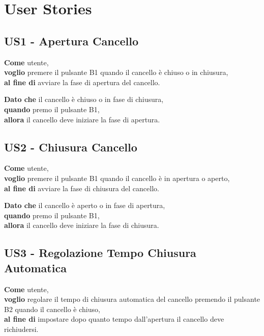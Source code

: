 \chapter{\bf{User Stories}}

\section{US1 - Apertura Cancello}
\begin{tcolorbox}[title={Descrizione}, colback=red!20!white, colframe=red!80!black]
    \textbf{Come} utente, \\
    \textbf{voglio} premere il pulsante B1 quando il cancello è chiuso o in chiusura, \\
    \textbf{al fine di} avviare la fase di apertura del cancello.
\end{tcolorbox}

\begin{tcolorbox}[title={Criterio di Accettazione}, colback=blue!20!white, colframe=blue!80!black]
    \textbf{Dato che} il cancello è chiuso o in fase di chiusura, \\
    \textbf{quando} premo il pulsante B1, \\
    \textbf{allora} il cancello deve iniziare la fase di apertura.
\end{tcolorbox}

\section{US2 - Chiusura Cancello}
\begin{tcolorbox}[title={Descrizione}, colback=red!20!white, colframe=red!80!black]
    \textbf{Come} utente, \\
    \textbf{voglio} premere il pulsante B1 quando il cancello è in apertura o aperto, \\
    \textbf{al fine di} avviare la fase di chiusura del cancello.
\end{tcolorbox}

\begin{tcolorbox}[title={Criterio di Accettazione}, colback=blue!20!white, colframe=blue!80!black]
    \textbf{Dato che} il cancello è aperto o in fase di apertura, \\
    \textbf{quando} premo il pulsante B1, \\
    \textbf{allora} il cancello deve iniziare la fase di chiusura.
\end{tcolorbox}

\section{US3 - Regolazione Tempo Chiusura Automatica}
\begin{tcolorbox}[title={Descrizione}, colback=red!20!white, colframe=red!80!black]
    \textbf{Come} utente, \\
    \textbf{voglio} regolare il tempo di chiusura automatica del cancello premendo il pulsante B2 quando il cancello è chiuso, \\
    \textbf{al fine di} impostare dopo quanto tempo dall’apertura il cancello deve richiudersi.
\end{tcolorbox}

